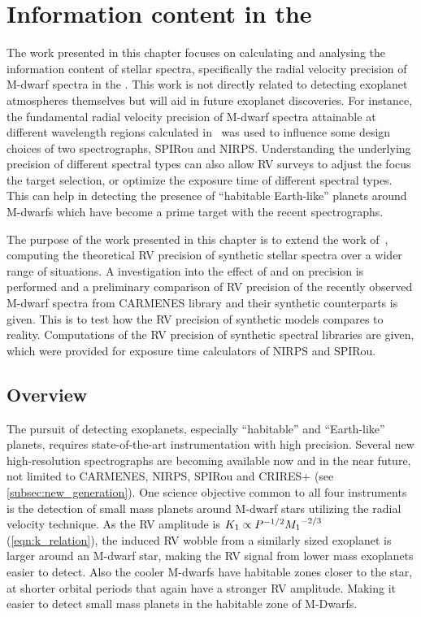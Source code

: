 
\chapter{Information content in the \nir{}}
\label{cha:nir_content}

The work presented in this chapter focuses on calculating and analysing the information content of stellar spectra, specifically the radial velocity precision of M-dwarf spectra in the \nir{}.
This work is not directly related to detecting exoplanet atmospheres themselves but will aid in future exoplanet discoveries.
For instance, the fundamental radial velocity precision of {M-dwarf} spectra attainable at different wavelength regions calculated in~\citet{figueira_radial_2016} was used to influence some design choices of two \nir{} spectrographs, {SPIRou} and {NIRPS}.
Understanding the underlying precision of different spectral types can also allow {RV} surveys to adjust the focus the target selection, or optimize the exposure time of different spectral types.
This can help in detecting the presence of ``habitable Earth-like'' planets around {M-dwarfs} which have become a prime target with the recent \nir{} spectrographs.

The purpose of the work presented in this chapter is to extend the work of~\citet{figueira_radial_2016}, computing the theoretical {RV} precision of synthetic stellar spectra over a wider range of situations.
A investigation into the effect of \Logg{} and \feh{} on precision is performed and a preliminary comparison of {RV} precision of the recently observed \nir{} {M-dwarf} spectra from {CARMENES} library and their synthetic counterparts is given.
This is to test how the {RV} precision of synthetic models compares to reality.
Computations of the {RV} precision of synthetic spectral libraries are given, which were provided for exposure time calculators of {NIRPS} and {SPIRou}. 


\section{Overview}
\label{sec:precision_overview}
The pursuit of detecting exoplanets, especially ``habitable'' and ``Earth-like'' planets, requires state-of-the-art instrumentation with high precision.
Several new high-resolution \nir{} spectrographs are becoming available now and in the near future, not limited to {CARMENES}, {NIRPS}, {SPIRou} and {CRIRES+} (see \cref{subsec:new_generation}).
One science objective common to all four instruments is the detection of small mass planets around {M-dwarf} stars utilizing the radial velocity technique.
As the {RV} amplitude is \({K}_{1}\propto {P}^{-{1/2}}{{M}_{1}}^{-2/3}\) (\cref{eqn:k_relation}), the induced {RV} wobble from a similarly sized exoplanet is larger around an M-dwarf star, making the {RV} signal from lower mass exoplanets easier to detect.
Also the cooler M-dwarfs have habitable zones closer to the star, at shorter orbital periods that again have a stronger {RV} amplitude.
Making it easier to detect small mass planets in the habitable zone of {M-Dwarfs}.

